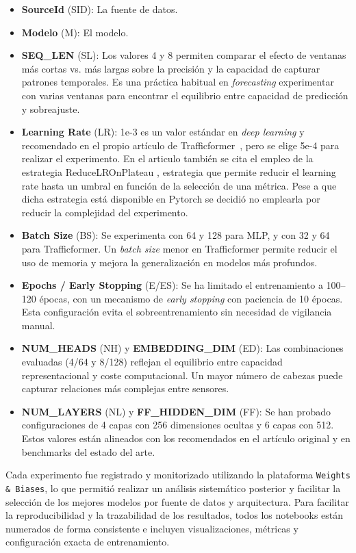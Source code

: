 \begin{itemize}
	\item \textbf{SourceId} (SID): La fuente de datos.
	\item \textbf{Modelo} (M): El modelo.
	\item \textbf{SEQ\_LEN} (SL): Los valores 4 y 8 permiten comparar el efecto de ventanas más cortas vs. más largas sobre la precisión y la capacidad de capturar patrones temporales. Es una práctica habitual en \textit{forecasting} experimentar con varias ventanas para encontrar el equilibrio entre capacidad de predicción y sobreajuste.
	\item \textbf{Learning Rate} (LR): 1e-3 es un valor estándar en \textit{deep learning} y recomendado en el propio artículo de Trafficformer~\cite{trafficformer}, pero se elige 5e-4 para realizar el experimento. En el articulo también se cita el empleo de la estrategia ReduceLROnPlateau \cite{ruder2017overviewgradientdescentoptimization}, estrategia que permite reducir el learning rate hasta un umbral en función de la selección de una métrica. Pese a que dicha estrategia está disponible en Pytorch \cite{pytorchReduceLrOnPLateau} se decidió no emplearla por reducir la complejidad del experimento.
	\item \textbf{Batch Size} (BS): Se experimenta con 64 y 128 para MLP, y con 32 y 64 para Trafficformer. Un \textit{batch size} menor en Trafficformer permite reducir el uso de memoria y mejora la generalización en modelos más profundos.
	\item \textbf{Epochs / Early Stopping} (E/ES): Se ha limitado el entrenamiento a 100--120 épocas, con un mecanismo de \textit{early stopping} con paciencia de 10 épocas. Esta configuración evita el sobreentrenamiento sin necesidad de vigilancia manual.
	\item \textbf{NUM\_HEADS} (NH) y \textbf{EMBEDDING\_DIM} (ED): Las combinaciones evaluadas (4/64 y 8/128) reflejan el equilibrio entre capacidad representacional y coste computacional. Un mayor número de cabezas puede capturar relaciones más complejas entre sensores.
	\item \textbf{NUM\_LAYERS} (NL) y \textbf{FF\_HIDDEN\_DIM} (FF): Se han probado configuraciones de 4 capas con 256 dimensiones ocultas y 6 capas con 512. Estos valores están alineados con los recomendados en el artículo original y en benchmarks del estado del arte.
\end{itemize}

Cada experimento fue registrado y monitorizado utilizando la plataforma \texttt{Weights \& Biases}, lo que permitió realizar un análisis sistemático posterior y facilitar la selección de los mejores modelos por fuente de datos y arquitectura. Para facilitar la reproducibilidad y la trazabilidad de los resultados, todos los notebooks están numerados de forma consistente e incluyen visualizaciones, métricas y configuración exacta de entrenamiento.

